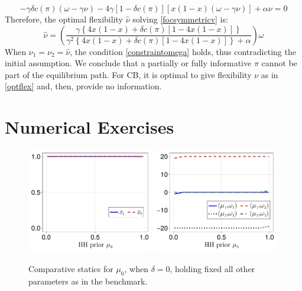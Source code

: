 \documentclass[12pt,a4paper]{article}
\begin{document}
\begin{equation}
\label{focsymmetricv}
    -\gamma\delta c(\pi)\left(\omega-\gamma \nu\right)-4\gamma[1-\delta c(\pi)]\left[x(1-x)(\omega-\gamma \nu)\right]+\alpha \nu=0
\end{equation}
Therefore, the optimal flexibility $\hat{\nu}$ solving \eqref{focsymmetricv} is:
\begin{equation}
    \hat{\nu}=\left(\frac{\gamma \left\{4x(1-x)+\delta c(\pi)[1-4x(1-x)]\right\}}{\gamma^2\left\{4x(1-x)+\delta c(\pi)[1-4x(1-x)] \right\}+\alpha }\right)\omega
\end{equation}
When $\nu_1=\nu_2=\hat{\nu}$, the condition \eqref{constraintomega} holds, thus contradicting the initial assumption. We conclude that a partially or fully informative $\pi$ cannot be part of the equilibrium path. For CB, it is optimal to give flexibility $\nu$ as in \eqref{optflex} and, then, provide no information.

\section{Numerical Exercises}

\begin{figure}[H]
\centering
\includegraphics[width=0.49\textwidth]{figures/V8/γ_10/fig_optimal_π_across_μ_0_ω_1_1_ω_2_-1_δ_0.0_.pdf}
\includegraphics[width=0.49\textwidth]{figures/V8/γ_10/fig_posterior_across_μ_0_ω_1_1_ω_2_-1_δ_0.0_.pdf}
\caption{Comparative statics for $\mu_0$, when $\delta=0$, holding fixed all other parameters as in the benchmark.}
\label{FigureA1}
\end{figure}
\end{document}

